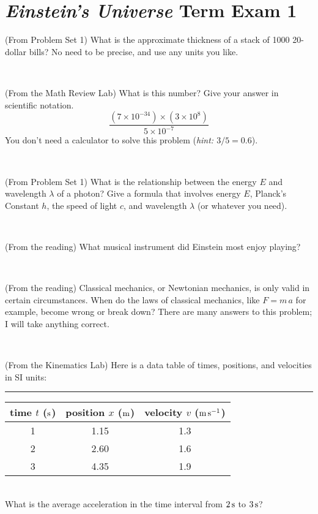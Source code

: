 \documentclass[12pt, letterpaper]{article}
\begin{document}
\section*{\textsl{Einstein's Universe} Term Exam 1}
\setcounter{problem}{1}


\begin{problem} (From Problem Set 1)
What is the approximate thickness of a stack of 1000 20-dollar bills?
No need to be precise, and use any units you like.
\end{problem}


\vfill ~

\begin{problem} (From the Math Review Lab)
What is this number? Give your answer in scientific notation.
$$
\frac{(7\times10^{-34})\times(3\times10^8)}{5\times10^{-7}}
$$
You don't need a calculator to solve this problem (\textit{hint: $3/5=0.6$}).
\end{problem}


\vfill ~

\begin{problem} (From Problem Set 1)
What is the relationship between the energy $E$ and wavelength
$\lambda$ of a photon? Give a formula that involves energy $E$,
Planck's Constant $h$, the speed of light $c$, and wavelength
$\lambda$ (or whatever you need).
\end{problem}

\vfill ~

\begin{problem} (From the reading)
What musical instrument did Einstein most enjoy playing?
\end{problem}


\vfill ~


\clearpage


\begin{problem} (From the reading)
Classical mechanics, or Newtonian mechanics, is only valid in certain
circumstances. When do the laws of classical mechanics, like $F =
m\,a$ for example, become wrong or break down? There are many answers
to this problem; I will take anything correct.
\end{problem}


\vfill ~

\begin{problem} (From the Kinematics Lab)
Here is a data table of times, positions, and velocities in SI units:\\
\rule{1.0in}{0pt}\begin{tabular}{c|c|c}
time $t$ ($\mathrm{s}$) & position $x$ ($\mathrm{m}$) & velocity $v$ ($\mathrm{m}\,\mathrm{s}^{-1}$) \\
\hline
1 & 1.15 & 1.3 \\
2 & 2.60 & 1.6 \\
3 & 4.35 & 1.9 \\
\hline
\end{tabular}\\
What is the average acceleration in the time interval from $2\,\mathrm{s}$ to $3\,\mathrm{s}$?
\end{problem}
\end{document}
